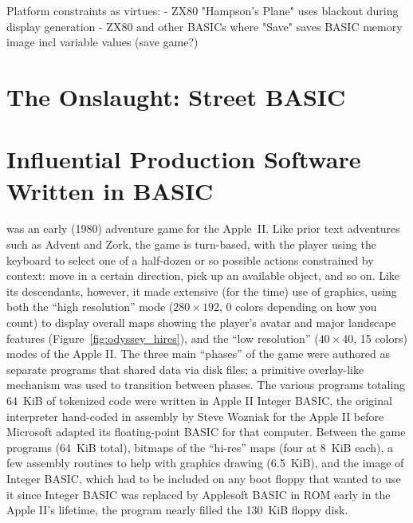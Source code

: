 \documentclass{article}
\begin{document}
Platform constraints as virtues:
 - ZX80 "Hampson's Plane" uses blackout during display generation 
 - ZX80 and other BASICs where "Save" saves BASIC memory image incl
 variable values (save game?)

\section{The Onslaught: Street BASIC}



\section{Influential Production Software Written in BASIC}




 was an early (1980) adventure game
for the Apple~II.
Like prior text adventures such as Advent and Zork, the game is
turn-based, with the player using the 
keyboard to select one of a half-dozen or so possible actions
constrained by context: move in a certain direction, pick up an
available object, and so on.
Like its descendants, however, it made extensive (for the time) use of
graphics, using both the ``high resolution'' mode ($280\times 192$, 0 colors
depending on how you count) to display overall maps showing the player's
avatar and major landscape features (Figure~\ref{fig:odyssey_hires}), and the
``low resolution'' ($40\times 40$, 15
colors) modes of the Apple II.
The three main ``phases'' of the game were authored as separate programs
that shared data via disk files; a primitive overlay-like mechanism was
used to transition between phases.  
The various programs totaling 64~KiB of tokenized code were written in Apple II Integer
BASIC, the
original interpreter hand-coded in assembly by Steve Wozniak for
the Apple II before Microsoft adapted its floating-point BASIC for that
computer.  Between the game programs (64~KiB total), bitmaps of the ``hi-res''
maps (four at 8~KiB each), a few assembly routines to help with graphics
drawing (6.5~KiB), and the image of Integer BASIC, which had to be
included on any boot floppy that wanted to use it since Integer BASIC
was replaced by Applesoft BASIC in ROM early in the Apple II's lifetime,
the program nearly filled the 130~KiB floppy disk.
\end{document}
